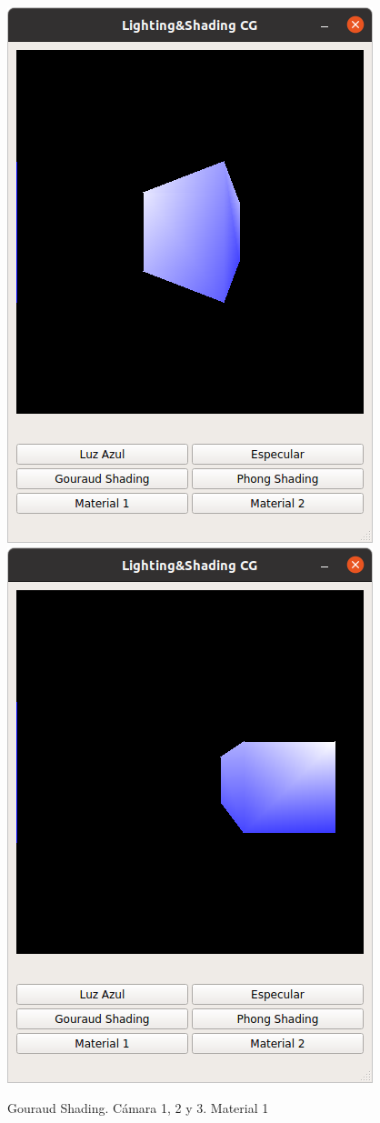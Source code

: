 \documentclass[12pt]{article}
\begin{document}
\begin{figure}[H]
\includegraphics[scale=0.5]{images/ej2.png}
\includegraphics[scale=0.5]{images/ej3.png}
\caption{Gouraud Shading. Cámara 1, 2 y 3. Material 1}
\end{figure}
\end{document}
